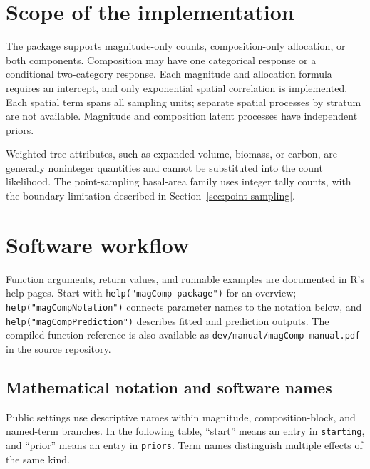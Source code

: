 \documentclass[11pt]{article}
\begin{document}
\section{Scope of the implementation}
\label{sec:implementation-limits}

The package supports magnitude-only counts, composition-only allocation, or
both components. Composition may have one categorical response or a conditional
two-category response. Each magnitude and allocation formula requires an intercept, and
only exponential spatial correlation is implemented. Each spatial term spans
all sampling units; separate spatial processes by stratum are not available.
Magnitude and composition latent processes have independent priors.

Weighted tree attributes, such as expanded volume, biomass, or carbon, are
generally noninteger quantities and cannot be substituted into the count
likelihood. The point-sampling basal-area family uses integer tally counts,
with the boundary limitation described in Section~\ref{sec:point-sampling}.

\section{Software workflow}

Function arguments, return values, and runnable examples are documented in
R's help pages. Start with \texttt{help("magComp-package")} for an overview;
\texttt{help("magCompNotation")} connects parameter names to the notation
below, and \texttt{help("magCompPrediction")} describes fitted and prediction
outputs. The compiled function reference is also available as
\texttt{dev/manual/magComp-manual.pdf} in the source repository.

\subsection{Mathematical notation and software names}
\label{sec:software-notation}

Public settings use descriptive names within magnitude, composition-block,
and named-term branches. In the following table,
``start'' means an entry in \texttt{starting}, and ``prior'' means an entry
in \texttt{priors}. Term names distinguish multiple effects of the same kind.
\end{document}
